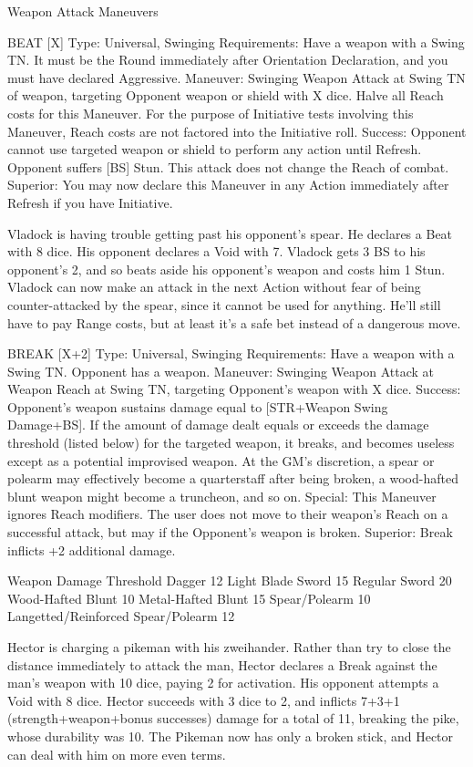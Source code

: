 \documentclass[oneside,11pt,english]{book}
\begin{document}
Weapon Attack Maneuvers

BEAT [X]
Type: Universal, Swinging
Requirements: Have a weapon with a Swing TN. It must be the Round immediately after Orientation Declaration, and you must have declared Aggressive.
Maneuver: Swinging Weapon Attack at Swing TN of weapon, targeting Opponent weapon or shield with X dice. Halve all Reach costs for this Maneuver. For the purpose of Initiative tests involving this Maneuver, Reach costs are not factored into the Initiative roll. 
Success: Opponent cannot use targeted weapon or shield to perform any action until Refresh. Opponent suffers [BS] Stun. This attack does not change the Reach of combat. 
Superior: You may now declare this Maneuver in any Action immediately after Refresh if you have Initiative. 


Vladock is having trouble getting past his opponent’s spear. He declares a Beat with 8 dice. His opponent declares a Void with 7. Vladock gets 3 BS to his opponent’s 2, and so beats aside his opponent’s weapon and costs him 1 Stun. Vladock can now make an attack in the next Action without fear of being counter-attacked by the spear, since it cannot be used for anything. He’ll still have to pay Range costs, but at least it’s a safe bet instead of a dangerous move. 


BREAK [X+2]
Type: Universal, Swinging 
Requirements: Have a weapon with a Swing TN. Opponent has a weapon. 
Maneuver: Swinging Weapon Attack at Weapon Reach at Swing TN, targeting Opponent’s weapon with X dice. 
Success: Opponent’s weapon sustains damage equal to [STR+Weapon Swing Damage+BS]. If the amount of damage dealt equals or exceeds the damage threshold (listed below) for the targeted weapon, it breaks, and becomes useless except as a potential improvised weapon. At the GM’s discretion, a spear or polearm may effectively become a quarterstaff after being broken, a wood-hafted blunt weapon might become a truncheon, and so on. 
Special: This Maneuver ignores Reach modifiers. The user does not move to their weapon’s Reach on a successful attack, but may if the Opponent’s weapon is broken. 
Superior: Break inflicts +2 additional damage. 


Weapon Damage Threshold 
Dagger 12 
Light Blade Sword 15 
Regular Sword 20 
Wood-Hafted Blunt 10 
Metal-Hafted Blunt 15 
Spear/Polearm 10 
Langetted/Reinforced Spear/Polearm 12 


Hector is charging a pikeman with his zweihander. Rather than try to close the distance immediately to attack the man, Hector declares a Break against the man’s weapon with 10 dice, paying 2 for activation. His opponent attempts a Void with 8 dice. Hector succeeds with 3 dice to 2, and inflicts 7+3+1 (strength+weapon+bonus successes) damage for a total of 11, breaking the pike, whose durability was 10. The Pikeman now has only a broken stick, and Hector can deal with him on more even terms. 
\end{document}
